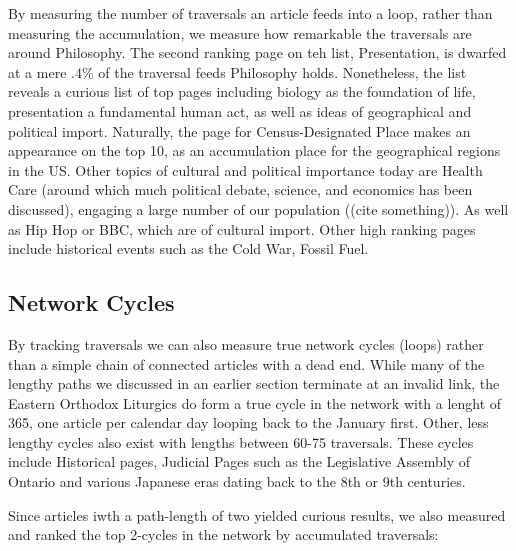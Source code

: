 \documentclass[twoside]{article}
\begin{document}
By measuring the number of traversals an article feeds into a loop, rather than measuring the accumulation, we measure how remarkable the traversals are around Philosophy. The second ranking page on teh list, Presentation, is dwarfed at a mere $.4\%$ of the traversal feeds Philosophy holds. 
Nonetheless, the list reveals a curious list of top pages including biology as the foundation of life, presentation a fundamental human act, as well as ideas of geographical and political import. Naturally, the page for Census-Designated Place makes an appearance on the top 10, as an accumulation place for the geographical regions in the US. Other topics of cultural and political importance today are Health Care (around which much political debate, science, and economics has been discussed), engaging a large number of our population ((cite something)). As well as Hip Hop or BBC, which are of cultural import. Other high ranking pages include historical events such as the Cold War, Fossil Fuel.

\subsection{Network Cycles}

By tracking traversals we can also measure true network cycles (loops) rather than a simple chain
of connected articles with a dead end. While many of the lengthy paths we discussed in an earlier section terminate at an invalid link, the Eastern Orthodox Liturgics do form a true cycle in the network with a lenght of 365, one article per calendar day looping back to the January first. Other, less lengthy cycles also exist with lengths between 60-75 traversals. These cycles include Historical pages, Judicial Pages such as the Legislative Assembly of Ontario and various Japanese eras dating back to the 8th or 9th centuries.


Since articles iwth a path-length of two yielded curious results, we also measured and ranked the top 2-cycles in the network by accumulated traversals: 
\end{document}
